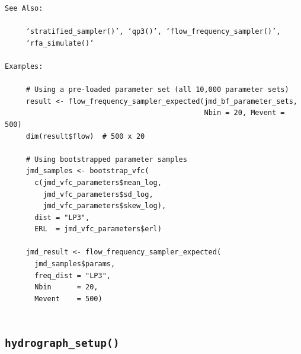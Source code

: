 \documentclass[
  letterpaper,
  DIV=11,
  numbers=noendperiod]{scrreprt}
\begin{document}
\begin{verbatim}
See Also:

     ‘stratified_sampler()’, ‘qp3()’, ‘flow_frequency_sampler()’,
     ‘rfa_simulate()’

Examples:

     # Using a pre-loaded parameter set (all 10,000 parameter sets)
     result <- flow_frequency_sampler_expected(jmd_bf_parameter_sets,
                                               Nbin = 20, Mevent = 500)
     dim(result$flow)  # 500 x 20
     
     # Using bootstrapped parameter samples
     jmd_samples <- bootstrap_vfc(
       c(jmd_vfc_parameters$mean_log,
         jmd_vfc_parameters$sd_log,
         jmd_vfc_parameters$skew_log),
       dist = "LP3",
       ERL  = jmd_vfc_parameters$erl)
     
     jmd_result <- flow_frequency_sampler_expected(
       jmd_samples$params,
       freq_dist = "LP3",
       Nbin      = 20,
       Mevent    = 500)
     
\end{verbatim}

\subsection{\texorpdfstring{\texttt{hydrograph\_setup()}}{hydrograph\_setup()}}\label{hydrograph_setup}
\end{document}
